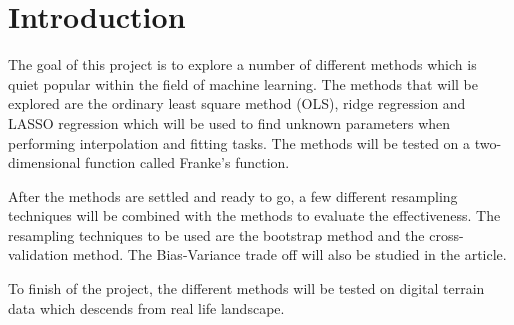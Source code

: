 \documentclass[../main.tex]{subfiles}
\begin{document}
\section{Introduction}\label{sec:introduction}
The goal of this project is to explore a number of different methods which is quiet popular within the field of machine learning. The methods that will be explored are the ordinary least square method (OLS), ridge regression and LASSO regression which will be used to find unknown parameters when performing interpolation and fitting tasks. The methods will be tested on a two-dimensional function called Franke’s function.

After the methods are settled and ready to go, a few different resampling techniques will be combined with the methods to evaluate the effectiveness. The resampling techniques to be used are the bootstrap method and the cross-validation method. The Bias-Variance trade off will also be studied in the article.

To finish of the project, the different methods will be tested on digital terrain data which descends from real life landscape.
\end{document}
